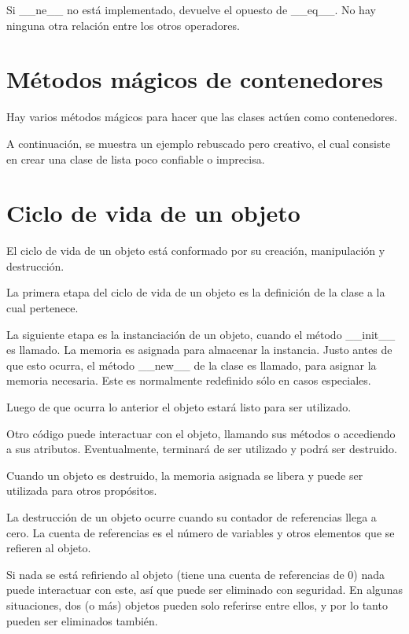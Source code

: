 \documentclass{report}
\begin{document}
Si \_\_ne\_\_ no está implementado, devuelve el opuesto de \_\_eq\_\_. No hay ninguna otra relación entre los otros operadores.


\section{Métodos mágicos de contenedores}

Hay varios métodos mágicos para hacer que las clases actúen como contenedores.


A continuación, se muestra un ejemplo rebuscado pero creativo, el cual consiste en crear una clase de lista poco confiable o imprecisa.



\section{Ciclo de vida de un objeto}

El ciclo de vida de un objeto está conformado por su creación, manipulación y destrucción.

La primera etapa del ciclo de vida de un objeto es la definición de la clase a la cual pertenece.

La siguiente etapa es la instanciación de un objeto, cuando el método \_\_init\_\_ es llamado. La memoria es asignada para almacenar la instancia. Justo antes de que esto ocurra, el método \_\_new\_\_ de la clase es llamado, para asignar la memoria necesaria. Este es normalmente redefinido sólo en casos especiales.

Luego de que ocurra lo anterior el objeto estará listo para ser utilizado.

Otro código puede interactuar con el objeto, llamando sus métodos o accediendo a sus atributos. Eventualmente, terminará de ser utilizado y podrá ser destruido.

Cuando un objeto es destruido, la memoria asignada se libera y puede ser utilizada para otros propósitos.

La destrucción de un objeto ocurre cuando su contador de referencias llega a cero. La cuenta de referencias es el número de variables y otros elementos que se refieren al objeto.

Si nada se está refiriendo al objeto (tiene una cuenta de referencias de 0) nada puede interactuar con este, así que puede ser eliminado con seguridad.
En algunas situaciones, dos (o más) objetos pueden solo referirse entre ellos, y por lo tanto pueden ser eliminados también.
\end{document}
